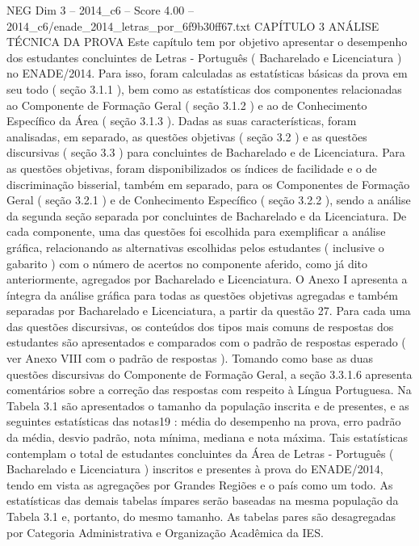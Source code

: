 \begin{textsample}{NEG Dim 3 – 2014\_c6 – Score 4.00 – 2014\_c6/enade\_2014\_letras\_por\_6f9b30ff67.txt}  \label{ex:f3_neg_249}
CAPÍTULO 3 ANÁLISE TÉCNICA DA PROVA Este capítulo tem por objetivo apresentar o desempenho dos estudantes concluintes de Letras - Português ( Bacharelado e Licenciatura ) no ENADE/2014.
Para isso, foram calculadas as estatísticas básicas da prova em seu todo ( seção 3.1.1 ), bem como as estatísticas dos componentes relacionadas ao Componente de Formação Geral ( seção 3.1.2 ) e ao de Conhecimento Específico da Área ( seção 3.1.3 ).
Dadas as suas características, foram analisadas, em separado, as questões objetivas ( seção 3.2 ) e as questões discursivas ( seção 3.3 ) para concluintes de Bacharelado e de Licenciatura.
Para as questões objetivas, foram disponibilizados os índices de facilidade e o de discriminação bisserial, também em separado, para os Componentes de Formação Geral ( seção 3.2.1 ) e de Conhecimento Específico ( seção 3.2.2 ), sendo a análise da segunda seção separada por concluintes de Bacharelado e da Licenciatura.
De cada componente, uma das questões foi escolhida para exemplificar a análise gráfica, relacionando as alternativas escolhidas pelos estudantes ( inclusive o gabarito ) com o número de acertos no componente aferido, como já dito anteriormente, agregados por Bacharelado e Licenciatura.
O Anexo I apresenta a íntegra da análise gráfica para todas as questões objetivas agregadas e também separadas por Bacharelado e Licenciatura, a partir da questão 27.
Para cada uma das questões discursivas, os conteúdos dos tipos mais comuns de respostas dos estudantes são apresentados e comparados com o padrão de respostas esperado ( ver Anexo VIII com o padrão de respostas ).
Tomando como base as duas questões discursivas do Componente de Formação Geral, a seção 3.3.1.6 apresenta comentários sobre a correção das respostas com respeito à Língua Portuguesa.
Na Tabela 3.1 são apresentados o tamanho da população inscrita e de presentes, e as seguintes estatísticas das notas19 : média do desempenho na prova, erro padrão da média, desvio padrão, nota mínima, mediana e nota máxima.
Tais estatísticas contemplam o total de estudantes concluintes da Área de Letras - Português ( Bacharelado e Licenciatura ) inscritos e presentes à prova do ENADE/2014, tendo em vista as agregações por Grandes Regiões e o país como um todo.
As estatísticas das demais tabelas ímpares serão baseadas na mesma população da Tabela 3.1 e, portanto, do mesmo tamanho.
As tabelas pares são desagregadas por Categoria Administrativa e Organização Acadêmica da IES.

\end{textsample}
